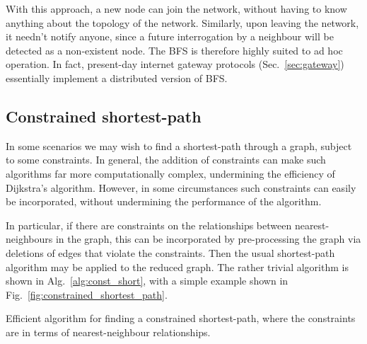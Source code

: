 With this approach, a new node can join the network, without having to know anything about the topology of the network. Similarly, upon leaving the network, it needn't notify anyone, since a future interrogation by a neighbour will be detected as a non-existent node. The BFS is therefore highly suited to ad hoc operation. In fact, present-day internet gateway protocols (Sec.~\ref{sec:gateway}) essentially implement a distributed version of BFS.

%
%

\subsection{Constrained shortest-path}\label{sec:const_short_path}

In some scenarios we may wish to find a shortest-path through a graph, subject to some constraints. In general, the addition of constraints can make such algorithms far more computationally complex, undermining the efficiency of Dijkstra's algorithm. However, in some circumstances such constraints can easily be incorporated, without undermining the performance of the algorithm.

In particular, if there are constraints on the relationships between nearest-neighbours in the graph, this can be incorporated by pre-processing the graph via deletions of edges that violate the constraints. Then the usual shortest-path algorithm may be applied to the reduced graph. The rather trivial algorithm is shown in Alg.~\ref{alg:const_short}, with a simple example shown in Fig.~\ref{fig:constrained_shortest_path}.

\begin{table}[!htbp]
\captionspacealg \caption{Efficient algorithm for finding a constrained shortest-path, where the constraints are in terms of nearest-neighbour relationships.} \label{alg:const_short}
\end{table}


